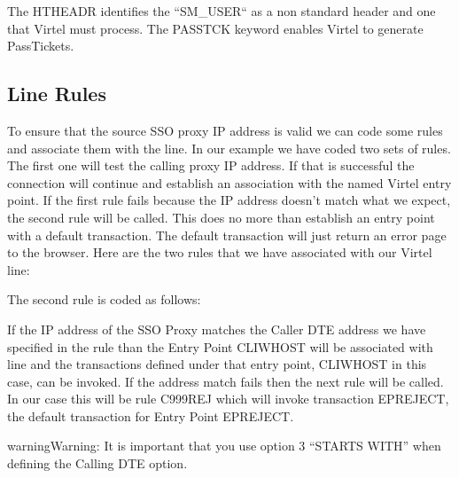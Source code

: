 \documentclass[letterpaper,10pt,english]{sphinxmanual}
\begin{document}
\sphinxAtStartPar
The HTHEADR identifies the “SM\_USER“ as a non standard header and one that Virtel must process. The PASSTCK keyword enables Virtel to generate PassTickets.

\newpage


\subsection{Line Rules}
\label{\detokenize{connectivity_guide:line-rules}}
\sphinxAtStartPar
To ensure that the source SSO proxy IP address is valid we can code some rules and associate them with the line. In our example we have coded two sets of rules. The first one will test the calling proxy IP address. If that is successful the connection will continue and establish an association with the named Virtel entry point. If the first rule fails because the IP address doesn’t match what we expect, the second rule will be called. This does no more than establish an entry point with a default transaction. The default transaction will just return an error page to the browser. Here are the two rules that we have associated with our Virtel line:\sphinxhyphen{}

\sphinxAtStartPar
{} 

\sphinxAtStartPar
The second rule is coded as follows:\sphinxhyphen{}

\sphinxAtStartPar
{} 

\sphinxAtStartPar
If the IP address of the SSO Proxy matches the Caller DTE address we have specified in the rule than the Entry Point CLIWHOST will be associated with line and the transactions defined under that entry point, CLIWHOST in this case, can be invoked. If the address match fails then the next rule will be called. In our case this will be rule C999REJ which will invoke transaction EPREJECT, the default transaction for Entry Point EPREJECT.

\begin{sphinxadmonition}{warning}{Warning:}
\sphinxAtStartPar
It is important that you use option 3 “STARTS WITH” when defining the Calling DTE option.
\end{sphinxadmonition}

\sphinxAtStartPar
{} 
\end{document}

